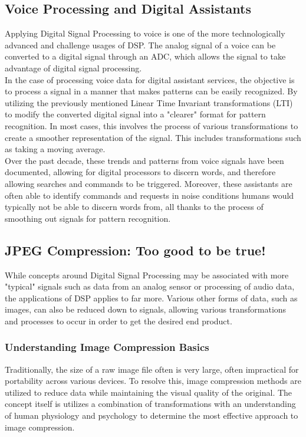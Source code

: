 \documentclass[11pt]{article}
\begin{document}
\subsection{Voice Processing and Digital Assistants}
Applying Digital Signal Processing to voice is one of the more technologically advanced and challenge usages of DSP. The analog signal of a voice can be converted to a digital signal through an ADC, which allows the signal to take advantage of digital signal processing.\\

In the case of processing voice data for digital assistant services, the objective is to process a signal in a manner that makes patterns can be easily recognized. By utilizing the previously mentioned Linear Time Invariant transformations (LTI) to modify the converted digital signal into a "clearer" format for pattern recognition. In most cases, this involves the process of various transformations to create a smoother representation of the signal. This includes transformations such as taking a moving average.\\

Over the past decade, these trends and patterns from voice signals have been documented, allowing for digital processors to discern words, and therefore allowing searches and commands to be triggered. Moreover, these assistants are often able to identify commands and requests in noise conditions humans would typically not be able to discern words from, all thanks to the process of smoothing out signals for pattern recognition.

\subsection{JPEG Compression: Too good to be true!}
While concepts around Digital Signal Processing may be associated with more "typical" signals such as data from an analog sensor or processing of audio data, the applications of DSP applies to far more. Various other forms of data, such as images, can also be reduced down to signals, allowing various transformations and processes to occur in order to get the desired end product.

\subsubsection{Understanding Image Compression Basics}

Traditionally, the size of a raw image file often is very large, often impractical for portability across various devices. To resolve this, image compression methods are utilized to reduce data while maintaining the visual quality of the original. The concept itself is utilizes a combination of transformations with an understanding of human physiology and psychology to determine the most effective approach to image compression.\\
\end{document}
